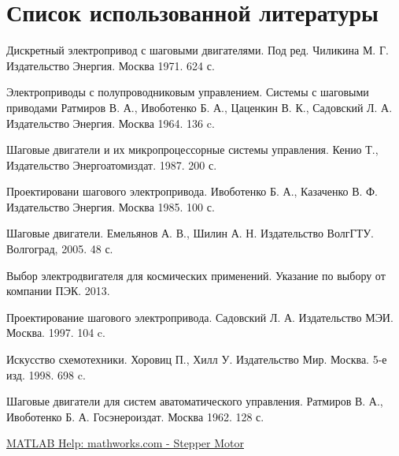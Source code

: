 \clearpage
\section{Список использованной литературы}
\begin{thebibliography}{30}

      Дискретный электропривод с шаговыми двигателями.
                        Под ред. Чиликина М. Г.
                        Издательство Энергия. Москва 1971. 624 с.

        Электроприводы с полупроводниковым управлением. Системы с шаговыми приводами
                                    Ратмиров В. А., Ивоботенко Б. А., Цаценкин В. К., Садовский Л. А.
                                    Издательство Энергия. Москва 1964. 136 c.

     Шаговые двигатели и их микропроцессорные системы управления.
                    Кенио Т.,
                    Издательство Энергоатомиздат. 1987. 200 с.

      Проектировани шагового электропривода.
                                    Ивоботенко Б. А., Казаченко В. Ф.
                                    Издательство Энергия. Москва 1985. 100 с.

       Шаговые двигатели.
                                Емельянов А. В., Шилин А. Н.
                                Издательство ВолгГТУ. Волгоград, 2005. 48 с.

     Выбор электродвигателя для космических применений.
                                    Указание по выбору от компании ПЭК. 2013.

      Проектирование шагового электропривода.
                        Садовский Л. А.
                        Издательство МЭИ. Москва. 1997. 104 c.

       Искусство схемотехники.
                            Хоровиц П., Хилл У.
                            Издательство Мир. Москва. 5-е изд. 1998. 698 c.

     Шаговые двигатели для систем аватоматического управления.
                                                Ратмиров В. А., Ивоботенко Б. А.
                                                Госэнероиздат. Москва 1962. 128 с.

     \href{http://www.mathworks.com/help/physmod/sps/powersys/ref/steppermotor.html}
                                            {MATLAB Help: mathworks.com - Stepper Motor}


\end{thebibliography}
